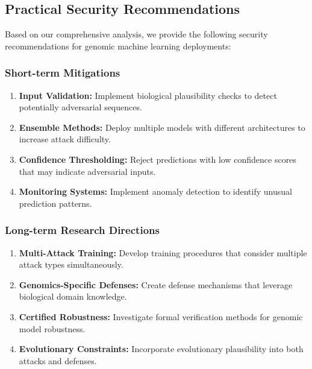 \documentclass{article} %
\begin{document}
\subsection{Practical Security Recommendations}

Based on our comprehensive analysis, we provide the following security recommendations for genomic machine learning deployments:

\subsubsection{Short-term Mitigations}

\begin{enumerate}
    \item \textbf{Input Validation:} Implement biological plausibility checks to detect potentially adversarial sequences.
    
    \item \textbf{Ensemble Methods:} Deploy multiple models with different architectures to increase attack difficulty.
    
    \item \textbf{Confidence Thresholding:} Reject predictions with low confidence scores that may indicate adversarial inputs.
    
    \item \textbf{Monitoring Systems:} Implement anomaly detection to identify unusual prediction patterns.
\end{enumerate}

\subsubsection{Long-term Research Directions}

\begin{enumerate}
    \item \textbf{Multi-Attack Training:} Develop training procedures that consider multiple attack types simultaneously.
    
    \item \textbf{Genomics-Specific Defenses:} Create defense mechanisms that leverage biological domain knowledge.
    
    \item \textbf{Certified Robustness:} Investigate formal verification methods for genomic model robustness.
    
    \item \textbf{Evolutionary Constraints:} Incorporate evolutionary plausibility into both attacks and defenses.
\end{enumerate}
\end{document}

